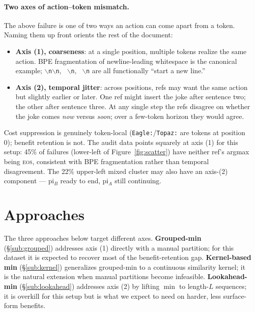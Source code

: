 \documentclass[11pt]{article}
\begin{document}
\paragraph{Two axes of action--token mismatch.} The above failure is one of two ways an action can come apart from a token. Naming them up front orients the rest of the document:
\begin{itemize}[leftmargin=*, itemsep=2pt, topsep=2pt]
\item \textbf{Axis (1), coarseness}: at a single position, multiple tokens realize the same action. BPE fragmentation of newline-leading whitespace is the canonical example; \texttt{$\backslash$n$\backslash$n}, \texttt{ $\backslash$n}, \texttt{  $\backslash$n} are all functionally ``start a new line.''
\item \textbf{Axis (2), temporal jitter}: across positions, refs may want the same action but slightly earlier or later. One ref might insert the joke after sentence two; the other after sentence three. At any single step the refs disagree on whether the joke comes \emph{now} versus \emph{soon}; over a few-token horizon they would agree.
\end{itemize}
Cost suppression is genuinely token-local (\texttt{Eagle:}/\texttt{Topaz:} are tokens at position 0); benefit retention is not. The audit data points squarely at axis (1) for this setup: 45\% of failures (lower-left of Figure~\ref{fig:scatter}) have neither ref's argmax being \textsc{eos}, consistent with BPE fragmentation rather than temporal disagreement. The 22\% upper-left mixed cluster may also have an axis-(2) component — pi$_B$ ready to end, pi$_A$ still continuing.

\section{Approaches}
\label{sec:approaches}

The three approaches below target different axes. \textbf{Grouped-min} (\S\ref{sub:grouped}) addresses axis (1) directly with a manual partition; for this dataset it is expected to recover most of the benefit-retention gap. \textbf{Kernel-based min} (\S\ref{sub:kernel}) generalizes grouped-min to a continuous similarity kernel; it is the natural extension when manual partitions become infeasible. \textbf{Lookahead-min} (\S\ref{sub:lookahead}) addresses axis (2) by lifting $\min$ to length-$L$ sequences; it is overkill for this setup but is what we expect to need on harder, less surface-form benefits.
\end{document}
